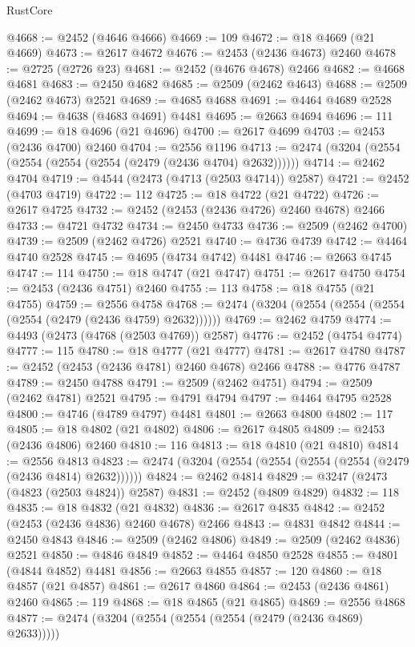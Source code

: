 \begin{lexlean}{RustCore}
\begin{coremodule}
@4668 := @2452 (@4646 @4666)
@4669 := 109
@4672 := @18 @4669 (@21 @4669)
@4673 := @2617 @4672
@4676 := @2453 (@2436 @4673) @2460
@4678 := @2725 (@2726 @23)
@4681 := @2452 (@4676 @4678) @2466
@4682 := @4668 @4681
@4683 := @2450 @4682
@4685 := @2509 (@2462 @4643)
@4688 := @2509 (@2462 @4673) @2521
@4689 := @4685 @4688
@4691 := @4464 @4689 @2528
@4694 := @4638 (@4683 @4691) @4481
@4695 := @2663 @4694
@4696 := 111
@4699 := @18 @4696 (@21 @4696)
@4700 := @2617 @4699
@4703 := @2453 (@2436 @4700) @2460
@4704 := @2556 @1196
@4713 := @2474 (@3204 (@2554 (@2554 (@2554 (@2554 (@2479 (@2436 @4704) @2632))))))
@4714 := @2462 @4704
@4719 := @4544 (@2473 (@4713 (@2503 @4714)) @2587)
@4721 := @2452 (@4703 @4719)
@4722 := 112
@4725 := @18 @4722 (@21 @4722)
@4726 := @2617 @4725
@4732 := @2452 (@2453 (@2436 @4726) @2460 @4678) @2466
@4733 := @4721 @4732
@4734 := @2450 @4733
@4736 := @2509 (@2462 @4700)
@4739 := @2509 (@2462 @4726) @2521
@4740 := @4736 @4739
@4742 := @4464 @4740 @2528
@4745 := @4695 (@4734 @4742) @4481
@4746 := @2663 @4745
@4747 := 114
@4750 := @18 @4747 (@21 @4747)
@4751 := @2617 @4750
@4754 := @2453 (@2436 @4751) @2460
@4755 := 113
@4758 := @18 @4755 (@21 @4755)
@4759 := @2556 @4758
@4768 := @2474 (@3204 (@2554 (@2554 (@2554 (@2554 (@2479 (@2436 @4759) @2632))))))
@4769 := @2462 @4759
@4774 := @4493 (@2473 (@4768 (@2503 @4769)) @2587)
@4776 := @2452 (@4754 @4774)
@4777 := 115
@4780 := @18 @4777 (@21 @4777)
@4781 := @2617 @4780
@4787 := @2452 (@2453 (@2436 @4781) @2460 @4678) @2466
@4788 := @4776 @4787
@4789 := @2450 @4788
@4791 := @2509 (@2462 @4751)
@4794 := @2509 (@2462 @4781) @2521
@4795 := @4791 @4794
@4797 := @4464 @4795 @2528
@4800 := @4746 (@4789 @4797) @4481
@4801 := @2663 @4800
@4802 := 117
@4805 := @18 @4802 (@21 @4802)
@4806 := @2617 @4805
@4809 := @2453 (@2436 @4806) @2460
@4810 := 116
@4813 := @18 @4810 (@21 @4810)
@4814 := @2556 @4813
@4823 := @2474 (@3204 (@2554 (@2554 (@2554 (@2554 (@2479 (@2436 @4814) @2632))))))
@4824 := @2462 @4814
@4829 := @3247 (@2473 (@4823 (@2503 @4824)) @2587)
@4831 := @2452 (@4809 @4829)
@4832 := 118
@4835 := @18 @4832 (@21 @4832)
@4836 := @2617 @4835
@4842 := @2452 (@2453 (@2436 @4836) @2460 @4678) @2466
@4843 := @4831 @4842
@4844 := @2450 @4843
@4846 := @2509 (@2462 @4806)
@4849 := @2509 (@2462 @4836) @2521
@4850 := @4846 @4849
@4852 := @4464 @4850 @2528
@4855 := @4801 (@4844 @4852) @4481
@4856 := @2663 @4855
@4857 := 120
@4860 := @18 @4857 (@21 @4857)
@4861 := @2617 @4860
@4864 := @2453 (@2436 @4861) @2460
@4865 := 119
@4868 := @18 @4865 (@21 @4865)
@4869 := @2556 @4868
@4877 := @2474 (@3204 (@2554 (@2554 (@2554 (@2479 (@2436 @4869) @2633)))))

\end{coremodule}
\end{lexlean}
